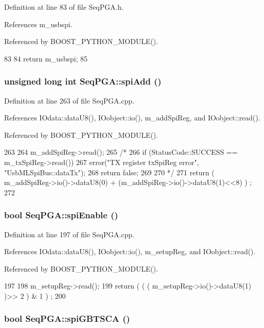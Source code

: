 Definition at line 83 of file SeqPGA.h.

References m\_\-usbspi.

Referenced by BOOST\_\-PYTHON\_\-MODULE().


\begin{DoxyCode}
83                     {
84     return m_usbspi;
85   }
\end{DoxyCode}
\hypertarget{classSeqPGA_af31a6428f365c1f8ded0ee381d249cde}{
\subsubsection[{spiAdd}]{\setlength{\rightskip}{0pt plus 5cm}unsigned long int SeqPGA::spiAdd ()}}
\label{classSeqPGA_af31a6428f365c1f8ded0ee381d249cde}


Definition at line 263 of file SeqPGA.cpp.

References IOdata::dataU8(), IOobject::io(), m\_\-addSpiReg, and IOobject::read().

Referenced by BOOST\_\-PYTHON\_\-MODULE().


\begin{DoxyCode}
263                                 {
264   m_addSpiReg->read();
265   /*
266     if (StatusCode::SUCCESS == m_txSpiReg->read()) {
267     error("TX register txSpiReg error", "UsbMLSpiBus::dataTx");
268     return false;
269     }
270   */
271   return ( m_addSpiReg->io()->dataU8(0) + (m_addSpiReg->io()->dataU8(1)<<8) ) ;
272 }
\end{DoxyCode}
\hypertarget{classSeqPGA_a6be337fc18199d758430bd178542abb4}{
\subsubsection[{spiEnable}]{\setlength{\rightskip}{0pt plus 5cm}bool SeqPGA::spiEnable ()}}
\label{classSeqPGA_a6be337fc18199d758430bd178542abb4}


Definition at line 197 of file SeqPGA.cpp.

References IOdata::dataU8(), IOobject::io(), m\_\-setupReg, and IOobject::read().

Referenced by BOOST\_\-PYTHON\_\-MODULE().


\begin{DoxyCode}
197                        {
198   m_setupReg->read();
199   return ( ( ( m_setupReg->io()->dataU8(1) )>> 2 ) & 1 ) ;
200 }
\end{DoxyCode}
\hypertarget{classSeqPGA_a2eadc7868d61ff79ea566b3fbfd977a5}{
\subsubsection[{spiGBTSCA}]{\setlength{\rightskip}{0pt plus 5cm}bool SeqPGA::spiGBTSCA ()}}
\label{classSeqPGA_a2eadc7868d61ff79ea566b3fbfd977a5}


